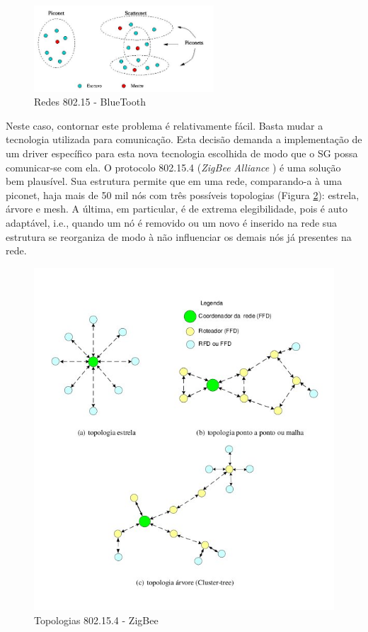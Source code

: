 \documentclass[12pt,a4paper,oneside]{report}
\begin{document}
\begin{figure}[htbp]
   \centering
    \includegraphics[width=0.6\textwidth]{figuras/scatternet}
    \caption{Redes 802.15 - BlueTooth}
    \label{fig:piconet-scatternet}
\end{figure}

Neste caso, contornar este problema é relativamente fácil. Basta mudar a tecnologia utilizada para comunicação. Esta decisão demanda a implementação de um driver específico para esta nova tecnologia escolhida de modo que o SG possa comunicar-se com ela. O protocolo 802.15.4 (\emph{ZigBee Alliance} \cite{zigbee}) é uma solução bem plausível. Sua estrutura permite que em uma rede, comparando-a à uma piconet, haja mais de 50 mil nós com três possíveis topologias (Figura \ref{fig:topologia-zigbee}): estrela, árvore e mesh. A última, em particular, é de extrema elegibilidade, pois é auto adaptável, i.e., quando um nó é removido ou um novo é inserido na rede sua estrutura se reorganiza de modo à não influenciar os demais nós já presentes na rede.

\begin{figure}[htbp]
   \centering
    \includegraphics[width=1\textwidth]{figuras/zigbee}
    \caption{Topologias 802.15.4 - ZigBee}
    \label{fig:topologia-zigbee}
\end{figure}
\end{document}

